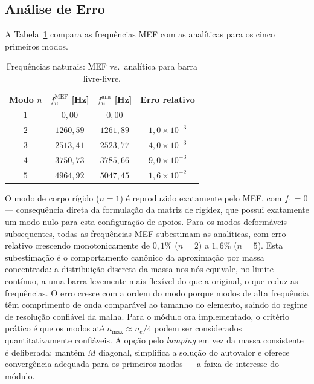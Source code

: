 \subsection{Análise de Erro}

A Tabela~\ref{tab:val_vibracao_erros} compara as frequências MEF com as analíticas para os cinco primeiros modos.

\begin{table}[htbp]
    \centering
    \caption{Frequências naturais: MEF vs.\ analítica para barra livre-livre.}
    \label{tab:val_vibracao_erros}
    \begin{tabular}{cccc}
        \hline
        \textbf{Modo} $n$ & $f_n^{\text{MEF}}$ [Hz] & $f_n^{\text{ana}}$ [Hz] & \textbf{Erro relativo} \\
        \hline
        $1$ & $0{,}00$   & $0{,}00$   & ---                      \\
        $2$ & $1260{,}59$ & $1261{,}89$ & $1{,}0 \times 10^{-3}$ \\
        $3$ & $2513{,}41$ & $2523{,}77$ & $4{,}0 \times 10^{-3}$ \\
        $4$ & $3750{,}73$ & $3785{,}66$ & $9{,}0 \times 10^{-3}$ \\
        $5$ & $4964{,}92$ & $5047{,}45$ & $1{,}6 \times 10^{-2}$ \\
        \hline
    \end{tabular}
\end{table}

O modo de corpo rígido ($n = 1$) é reproduzido exatamente pelo MEF, com $f_1 = 0$ --- consequência direta da formulação da matriz de rigidez, que possui exatamente um modo nulo para esta configuração de apoios. Para os modos deformáveis subsequentes, todas as frequências MEF subestimam as analíticas, com erro relativo crescendo monotonicamente de $0{,}1\%$ ($n = 2$) a $1{,}6\%$ ($n = 5$). Esta subestimação é o comportamento canônico da aproximação por massa concentrada: a distribuição discreta da massa nos nós equivale, no limite contínuo, a uma barra levemente mais flexível do que a original, o que reduz as frequências. O erro cresce com a ordem do modo porque modos de alta frequência têm comprimento de onda comparável ao tamanho do elemento, saindo do regime de resolução confiável da malha. Para o módulo ora implementado, o critério prático é que os modos até $n_{\max} \approx n_e / 4$ podem ser considerados quantitativamente confiáveis. A opção pelo \emph{lumping} em vez da massa consistente é deliberada: mantém $M$ diagonal, simplifica a solução do autovalor e oferece convergência adequada para os primeiros modos --- a faixa de interesse do módulo.

